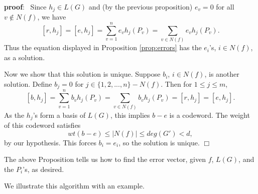 \documentclass[12pt]{article}
\def\pf{{\bf proof}:\ }
\def\qed{$\Box$}
\begin{document}
\pf 
Since $h_j\in L(G)$ and (by the previous proposition)
$e_v=0$ for all $v\notin N(f)$, we have
\[
[r,h_j]=[e,h_j]=\sum_{v=1}^n e_v h_j(P_v)
=\sum_{v\in N(f)} e_v h_j(P_v).
\]
Thus the equation displayed in Proposition
\ref{prop:errors} has the $e_i$'s, $i\in N(f)$, as a solution.

Now we show that this solution is unique. Suppose
$b_i$, $i\in N(f)$, is another solution. Define
$b_j=0$ for $j\in \{1,2,...,n\}-N(f)$. Then
for $1\leq j\leq m$,
\[
[b,h_j]=\sum_{v=1}^n b_v h_j(P_v)
=\sum_{v\in N(f)} b_v h_j(P_v)=[r,h_j]=[e,h_j].
\]
As the $h_j$'s form a basis of $L(G)$, this implies
$b-e$ is a codeword. The weight of this codeword
satisfies 
\[
wt(b-e)\leq |N(f)|\leq deg(G')< d,
\]
by our hypothesis. This forces $b_i=e_i$,
so the solution is unique. 
\qed

The above Proposition tells us how to find the error vector, given 
$f$, $L(G)$, and the $P_i$'s, as desired.

We illustrate this algorithm with an example.
\end{document}
